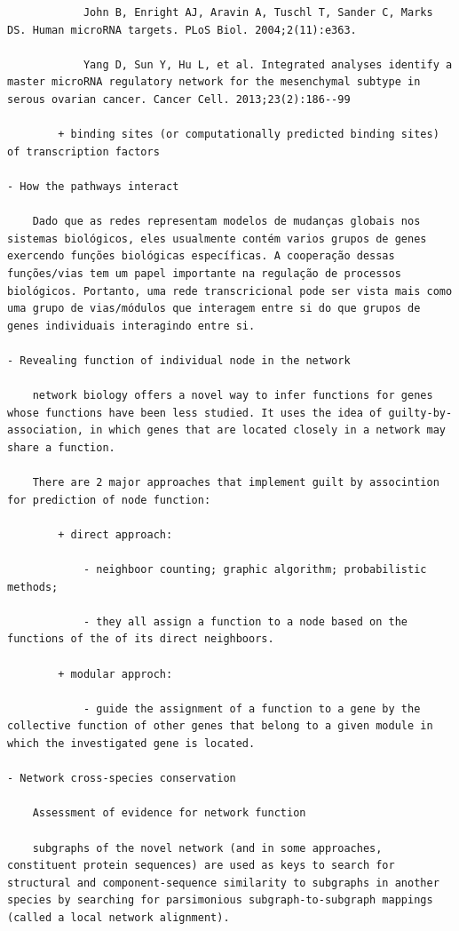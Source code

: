 \documentclass[
]{book}
\begin{document}
\begin{verbatim}
            John B, Enright AJ, Aravin A, Tuschl T, Sander C, Marks DS. Human microRNA targets. PLoS Biol. 2004;2(11):e363.

            Yang D, Sun Y, Hu L, et al. Integrated analyses identify a master microRNA regulatory network for the mesenchymal subtype in serous ovarian cancer. Cancer Cell. 2013;23(2):186--99

        + binding sites (or computationally predicted binding sites) of transcription factors

- How the pathways interact

    Dado que as redes representam modelos de mudanças globais nos sistemas biológicos, eles usualmente contém varios grupos de genes exercendo funções biológicas específicas. A cooperação dessas funções/vias tem um papel importante na regulação de processos biológicos. Portanto, uma rede transcricional pode ser vista mais como uma grupo de vias/módulos que interagem entre si do que grupos de genes individuais interagindo entre si.

- Revealing function of individual node in the network

    network biology offers a novel way to infer functions for genes whose functions have been less studied. It uses the idea of guilty-by-association, in which genes that are located closely in a network may share a function.

    There are 2 major approaches that implement guilt by associntion for prediction of node function:

        + direct approach:

            - neighboor counting; graphic algorithm; probabilistic methods;

            - they all assign a function to a node based on the functions of the of its direct neighboors.

        + modular approch:

            - guide the assignment of a function to a gene by the collective function of other genes that belong to a given module in which the investigated gene is located.

- Network cross-species conservation

    Assessment of evidence for network function

    subgraphs of the novel network (and in some approaches, constituent protein sequences) are used as keys to search for structural and component-sequence similarity to subgraphs in another species by searching for parsimonious subgraph-to-subgraph mappings (called a local network alignment).


\end{verbatim}
\end{document}
